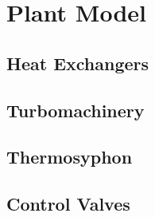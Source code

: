 \chapter{Plant Model}
\section{Heat Exchangers}
\section{Turbomachinery}
\section{Thermosyphon}
\section{Control Valves}